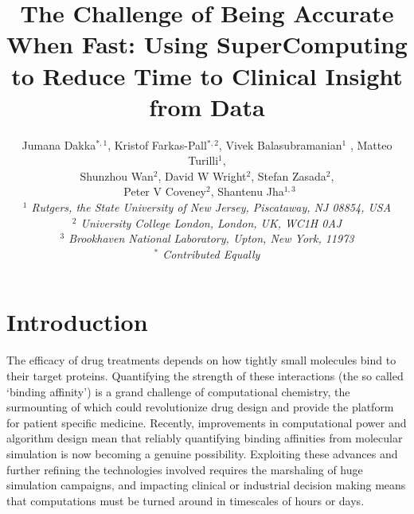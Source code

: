\documentclass[conference]{IEEEtran}
\begin{document}


\title{The Challenge of Being Accurate When Fast: Using SuperComputing to Reduce Time to Clinical Insight from Data}



\author{Jumana Dakka$^{*,1}$, Kristof Farkas-Pall$^{*,2}$, Vivek Balasubramanian$^{1}$ , Matteo Turilli$^{1}$, \\ 
 Shunzhou Wan$^{2}$, David W Wright$^{2}$, Stefan Zasada$^{2}$, \\\
 Peter V Coveney$^{2}$, Shantenu Jha$^{1,3}$ \\

  \small{\emph{$^{1}$ Rutgers, the State University of New Jersey, Piscataway, NJ 08854, USA}}\\
   \small{\emph{$^{2}$ University College London, London, UK, WC1H 0AJ}}\\
   \small{\emph{$^{3}$ Brookhaven National Laboratory, Upton, New York, 11973}}\\
   \small{\emph{$^{*}$ Contributed Equally}}
}


\date{}
\maketitle

\begin{abstract} 

\end{abstract}


\section{Introduction}\label{sec:intro}

The efficacy of drug treatments depends on how tightly small molecules bind to their target proteins. Quantifying the strength of these interactions (the so called ‘binding affinity’) is a grand challenge of computational chemistry, the surmounting of which could revolutionize drug design and provide the platform for patient specific medicine. Recently, improvements in computational power and algorithm design mean that reliably quantifying binding affinities from molecular simulation is now becoming a genuine possibility. Exploiting these advances and further refining the technologies involved requires the marshaling of huge simulation campaigns, and impacting clinical or industrial decision making means that computations must be turned around in timescales of hours or days. 
\end{document}
